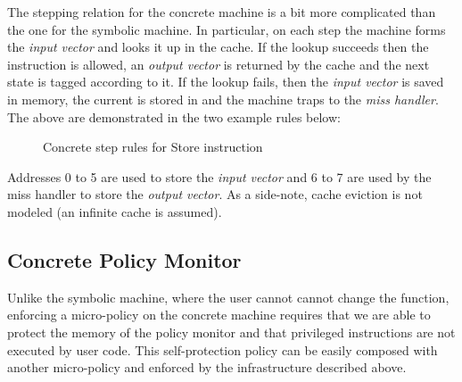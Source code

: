The stepping relation for the concrete machine is a bit more complicated than
the one for the symbolic machine. In particular, on each step the machine forms
the \emph{input vector} and looks it up in the cache. If the lookup succeeds
then the instruction is allowed, an \emph{output vector} is returned by the
cache and the next state is tagged according to it.
If the lookup fails, then the \emph{input vector} is saved in memory, the
current \pc is stored in \epc and the machine traps to the \emph{miss handler}.
The above are demonstrated in the two example rules below:

\begin{figure}[H]
\bigskip
{}
\caption{Concrete step rules for Store instruction}
\end{figure}

Addresses 0 to 5 are used to store the \emph{input vector} and 6 to 7 are used
by the miss handler to store the \emph{output vector}. As a side-note, cache
eviction is not modeled (an infinite cache is assumed).

\subsection{Concrete Policy Monitor}\label{sec:concrete_policy}

Unlike the symbolic machine, where the user cannot cannot change the
\TRANSFER function, enforcing a micro-policy on the concrete machine requires
that we are able to protect the memory of the policy monitor and that privileged
instructions are not executed by user code. This self-protection policy can be
easily composed with another micro-policy and enforced by the infrastructure
described above.


